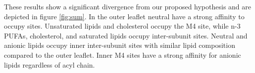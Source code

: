 \documentclass[preprint,3p,9pt,times,onecolumn]{elsarticle}
\begin{document}
These results show a significant divergence from our proposed hypothesis and are depicted in figure \ref{fig:sum}. In the outer leaflet neutral have a strong affinity to occupy sites. Unsaturated lipids and cholesterol occupy the M4 site, while n-3 PUFAs, cholesterol, and saturated lipids occupy inter-subunit sites. Neutral and anionic lipids occupy inner inter-subunit sites with similar lipid composition compared to the outer leaflet. Inner M4 sites have a strong affinity for anionic lipids regardless of acyl chain.












\end{document}
